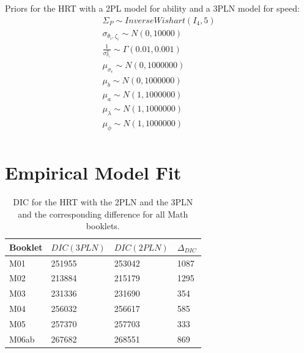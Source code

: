 \documentclass[a4paper,man,apacite,donotrepeattitle]{apa6}
\begin{document}
Priors for the HRT with a 2PL model for ability and a 3PLN model for speed:
\begin{equation}
\begin{gathered}
\Sigma_P \sim InverseWishart(I_4, 5) \\
\sigma_{\theta_i, \zeta_i} \sim N(0, 10000) \\
\frac{1}{\sigma^2_{\sigma_{\epsilon}}} \sim \Gamma(0.01, 0.001) \\
\mu_{\sigma_{\epsilon}} \sim N(0, 1000000) \\
\mu_{b} \sim N(0, 1000000) \\
\mu_{a} \sim N(1, 1000000) \\
\mu_{\lambda} \sim N(1, 1000000) \\
\mu_{\phi} \sim N(1, 1000000) \\
\end{gathered}
\end{equation}

\section{Empirical Model Fit}
\begin{table}
\centering
\caption{DIC for the HRT with the 2PLN and the 3PLN and the corresponding difference for all
                    Math booklets.} 
\begin{tabular}{llll}
  \hline
Booklet & $DIC(3PLN)$ & $DIC(2PLN)$ & $\Delta_{DIC}$ \\ 
  \hline
M01 & 251955 & 253042 & 1087 \\ 
  M02 & 213884 & 215179 & 1295 \\ 
  M03 & 231336 & 231690 & 354 \\ 
  M04 & 256032 & 256617 & 585 \\ 
  M05 & 257370 & 257703 & 333 \\ 
  M06ab & 267682 & 268551 & 869 \\ 
   \hline
\end{tabular}
\end{table}
\end{document}
